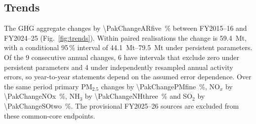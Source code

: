 \documentclass[essd,manuscript]{copernicus}
\begin{document}
\subsection{Trends}
The GHG aggregate changes by \SI{\PakChangeARfive}{\percent} between FY2015--16 and FY2024--25 (Fig.~\ref{fig:trends}). Within paired realisations the change is \SI{59.4}{\mega\tonne}, with a conditional 95\,\% interval of \SIrange{44.1}{79.5}{\mega\tonne} under persistent parameters. Of the \num{9} consecutive annual changes, \num{6} have intervals that exclude zero under persistent parameters and \num{4} under independently resampled annual activity errors, so year-to-year statements depend on the assumed error dependence. Over the same period primary PM$_{2.5}$ changes by \SI{\PakChangePMfine}{\percent}, NO$_x$ by \SI{\PakChangeNOx}{\percent}, NH$_3$ by \SI{\PakChangeNHthree}{\percent} and SO$_2$ by \SI{\PakChangeSOtwo}{\percent}. The provisional FY2025--26 sources are excluded from these common-core endpoints.
\end{document}
